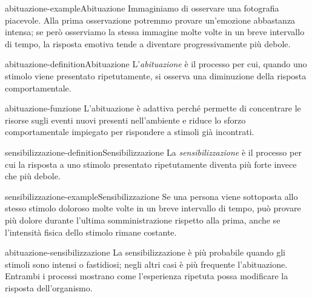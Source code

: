 \documentclass[preview]{standalone}
\begin{document}
\begin{snippetexample}{abituazione-example}{Abituazione}
    Immaginiamo di osservare una fotografia piacevole. Alla prima osservazione
    potremmo provare un'emozione abbastanza intensa; se però osserviamo la
    stessa immagine molte volte in un breve intervallo di tempo, la risposta
    emotiva tende a diventare progressivamente più debole.
\end{snippetexample}

\begin{snippetdefinition}{abituazione-definition}{Abituazione}
    L'\emph{abituazione} è il processo per cui, quando uno stimolo viene
    presentato ripetutamente, si osserva una diminuzione della risposta
    comportamentale.
\end{snippetdefinition}

\begin{snippet}{abituazione-funzione}
    L'abituazione è adattiva perché permette di concentrare le risorse sugli
    eventi nuovi presenti nell'ambiente e riduce lo sforzo comportamentale
    impiegato per rispondere a stimoli già incontrati.
\end{snippet}

\begin{snippetdefinition}{sensibilizzazione-definition}{Sensibilizzazione}
    La \emph{sensibilizzazione} è il processo per cui la risposta a uno stimolo
    presentato ripetutamente diventa più forte invece che più debole.
\end{snippetdefinition}

\begin{snippetexample}{sensibilizzazione-example}{Sensibilizzazione}
    Se una persona viene sottoposta allo stesso stimolo doloroso molte volte in
    un breve intervallo di tempo, può provare più dolore durante l'ultima
    somministrazione rispetto alla prima, anche se l'intensità fisica dello
    stimolo rimane costante.
\end{snippetexample}

\begin{snippet}{abituazione-sensibilizzazione}
    La sensibilizzazione è più probabile quando gli stimoli sono intensi o
    fastidiosi; negli altri casi è più frequente l'abituazione. Entrambi i
    processi mostrano come l'esperienza ripetuta possa modificare la risposta
    dell'organismo.
\end{snippet}
\end{document}
